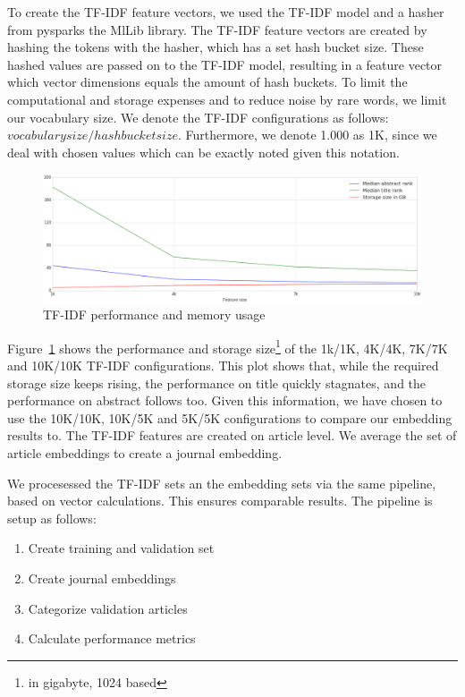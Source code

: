 \documentclass[../../Thesis.tex]{subfiles}
\begin{document}
To create the TF-IDF feature vectors, we used the TF-IDF model and a hasher from pysparks the MlLib library. The TF-IDF feature vectors are created by hashing the tokens with the hasher, which has a set hash bucket size. These hashed values are passed on to the TF-IDF model, resulting in a feature vector which vector dimensions equals the amount of hash buckets. To limit the computational and storage expenses and to reduce noise by rare words, we limit our vocabulary size.
We denote the TF-IDF configurations as follows: $vocabulary size/hashbucket size$. Furthermore, we denote 1.000 as 1K, since we deal with chosen values which can be exactly noted given this notation.\\
\begin{figure}
\includegraphics[width=6in]{Plots/tfidf_selection_plot}
\caption{TF-IDF performance and memory usage}\label{figure:tfidfPerformance}
\end{figure}

Figure~\ref{figure:tfidfPerformance} shows the performance and storage size\footnote{in gigabyte, 1024 based} of the 1k/1K, 4K/4K, 7K/7K and 10K/10K TF-IDF configurations. This plot shows that, while the required storage size keeps rising, the performance on title quickly stagnates, and the performance on abstract follows too. Given this information, we have chosen to use the 10K/10K, 10K/5K and 5K/5K configurations to compare our embedding results to. The TF-IDF features are created on article level. We average the set of article embeddings to create a journal embedding. 

We procesessed the TF-IDF sets an the embedding sets via the same pipeline, based on vector calculations. This ensures comparable results. The pipeline is setup as follows:
\begin{enumerate}
\item{Create training and validation set}
\item{Create journal embeddings}
\item{Categorize validation articles}
\item{Calculate performance metrics}
\end{enumerate}
  
\end{document}
